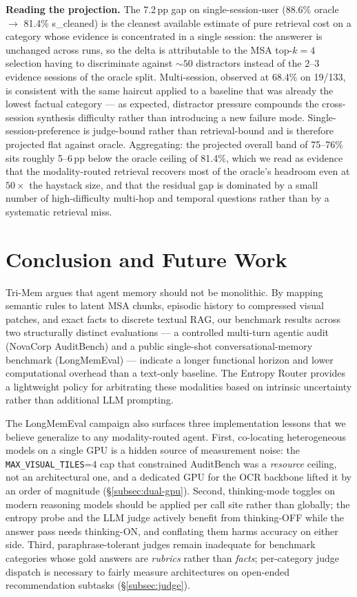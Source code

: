 \documentclass[conference]{IEEEtran}
\begin{document}
\textbf{Reading the projection.} The 7.2\,pp gap on single-session-user (88.6\% oracle $\rightarrow$ 81.4\% s\_cleaned) is the cleanest available estimate of pure retrieval cost on a category whose evidence is concentrated in a single session: the answerer is unchanged across runs, so the delta is attributable to the MSA top-$k=4$ selection having to discriminate against ${\sim}50$ distractors instead of the 2--3 evidence sessions of the oracle split. Multi-session, observed at 68.4\% on 19/133, is consistent with the same haircut applied to a baseline that was already the lowest factual category --- as expected, distractor pressure compounds the cross-session synthesis difficulty rather than introducing a new failure mode. Single-session-preference is judge-bound rather than retrieval-bound and is therefore projected flat against oracle. Aggregating: the projected overall band of 75--76\% sits roughly 5--6\,pp below the oracle ceiling of 81.4\%, which we read as evidence that the modality-routed retrieval recovers most of the oracle's headroom even at $50\times$ the haystack size, and that the residual gap is dominated by a small number of high-difficulty multi-hop and temporal questions rather than by a systematic retrieval miss.

\section{Conclusion and Future Work}
Tri-Mem argues that agent memory should not be monolithic. By mapping semantic rules to latent MSA chunks, episodic history to compressed visual patches, and exact facts to discrete textual RAG, our benchmark results across two structurally distinct evaluations --- a controlled multi-turn agentic audit (NovaCorp AuditBench) and a public single-shot conversational-memory benchmark (LongMemEval) --- indicate a longer functional horizon and lower computational overhead than a text-only baseline. The Entropy Router provides a lightweight policy for arbitrating these modalities based on intrinsic uncertainty rather than additional LLM prompting.

The LongMemEval campaign also surfaces three implementation lessons that we believe generalize to any modality-routed agent. First, co-locating heterogeneous models on a single GPU is a hidden source of measurement noise: the \texttt{MAX\_VISUAL\_TILES}=$4$ cap that constrained AuditBench was a \textit{resource} ceiling, not an architectural one, and a dedicated GPU for the OCR backbone lifted it by an order of magnitude (\S\ref{subsec:dual-gpu}). Second, thinking-mode toggles on modern reasoning models should be applied per call site rather than globally; the entropy probe and the LLM judge actively benefit from thinking-OFF while the answer pass needs thinking-ON, and conflating them harms accuracy on either side. Third, paraphrase-tolerant judges remain inadequate for benchmark categories whose gold answers are \textit{rubrics} rather than \textit{facts}; per-category judge dispatch is necessary to fairly measure architectures on open-ended recommendation subtasks (\S\ref{subsec:judge}).
\end{document}
